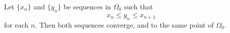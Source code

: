 Let $\{x_n\}$ and $\{y_n\}$ be sequences in $\Omega_0$ such that
$$x_n \leq y_n \leq x_{n+1}$$
for each $n$. Then both sequences converge, and to the same point of $\Omega_0$.
